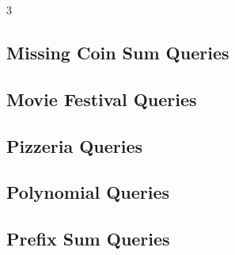 \documentclass[8pt]{extarticle}
\begin{document}
\begin{multicols*}{3}
\subsection{Missing Coin Sum Queries}
\begin{caixaenunciado}

\end{caixaenunciado}
\vspace{0.3cm}


\subsection{Movie Festival Queries}
\begin{caixaenunciado}

\end{caixaenunciado}
\vspace{0.3cm}


\subsection{Pizzeria Queries}
\begin{caixaenunciado}

\end{caixaenunciado}
\vspace{0.3cm}


\subsection{Polynomial Queries}
\begin{caixaenunciado}

\end{caixaenunciado}
\vspace{0.3cm}


\subsection{Prefix Sum Queries}
\begin{caixaenunciado}

\end{caixaenunciado}
\vspace{0.3cm}



\end{multicols*}
\end{document}
